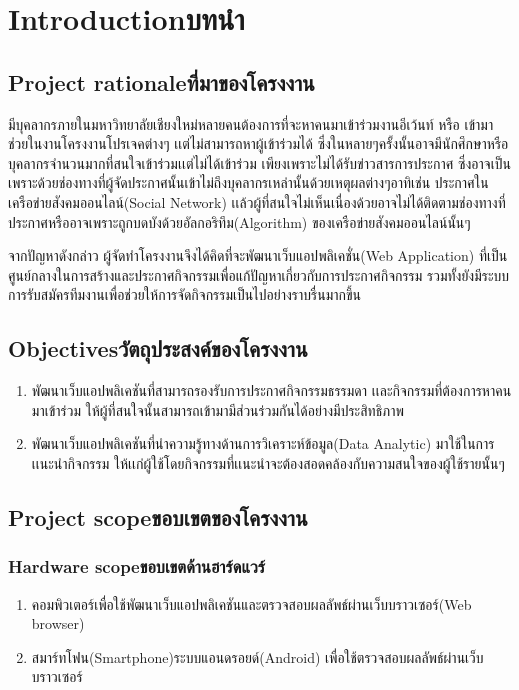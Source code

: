 \chapter{\ifenglish Introduction\else บทนำ\fi}

\section{\ifenglish Project rationale\else ที่มาของโครงงาน\fi}
มีบุคลากรภายในมหาวิทยาลัยเชียงใหม่หลายคนต้องการที่จะหาคนมาเข้าร่วมงานอีเว้นท์ หรือ เข้ามาช่วยในงานโครงงานโปรเจคต่างๆ เเต่ไม่สามารถหาผู้เข้าร่วมได้ ซึ่งในหลายๆครั้งนั้นอาจมีนักศึกษาหรือบุคลากรจำนวนมากที่สนใจเข้าร่วมเเต่ไม่ได้เข้าร่วม เพียงเพราะไม่ได้รับข่าวสารการประกาศ ซึ่งอาจเป็นเพราะด้วยช่องทางที่ผู้จัดประกาศนั้นเข้าไม่ถึงบุคลากรเหล่านั้นด้วยเหตุผลต่างๆอาทิเช่น ประกาศในเครือข่ายสังคมออนไลน์(Social Network) เเล้วผู้ที่สนใจไม่เห็นเนื่องด้วยอาจไม่ได้ติดตามช่องทางที่ประกาศหรืออาจเพราะถูกบดบังด้วยอัลกอริทึม(Algorithm) ของเครือข่ายสังคมออนไลน์นั้นๆ

จากปัญหาดังกล่าว ผู้จัดทำโครงงานจึงได้คิดที่จะพัฒนาเว็บแอปพลิเคชั่น(Web Application) ที่เป็นศูนย์กลางในการสร้างและประกาศกิจกรรมเพื่อแก้ปัญหาเกี่ยวกับการประกาศกิจกรรม รวมทั้งยังมีระบบการรับสมัครทีมงานเพื่อช่วยให้การจัดกิจกรรมเป็นไปอย่างราบรื่นมากขึ้น


\section{\ifenglish Objectives\else วัตถุประสงค์ของโครงงาน\fi}
\begin{enumerate}
    \item พัฒนาเว็บแอปพลิเคชันที่สามารถรองรับการประกาศกิจกรรมธรรมดา เเละกิจกรรมที่ต้องการหาคนมาเข้าร่วม ให้ผู้ที่สนใจนั้นสามารถเข้ามามีส่วนร่วมกันได้อย่างมีประสิทธิภาพ
    \item พัฒนาเว็บแอปพลิเคชันที่นำความรู้ทางด้านการวิเคราะห์ข้อมูล(Data Analytic) มาใช้ในการเเนะนำกิจกรรม ให้เเก่ผู้ใช้โดยกิจกรรมที่เเนะนำจะต้องสอดคล้องกับความสนใจของผู้ใช้รายนั้นๆ
\end{enumerate}

\section{\ifenglish Project scope\else ขอบเขตของโครงงาน\fi}

\subsection{\ifenglish Hardware scope\else ขอบเขตด้านฮาร์ดแวร์\fi}
\begin{enumerate}
    \item คอมพิวเตอร์เพื่อใช้พัฒนาเว็บแอปพลิเคชันและตรวจสอบผลลัพธ์ผ่านเว็บบราวเซอร์(Web browser)
    \item สมาร์ทโฟน(Smartphone)ระบบแอนดรอยด์(Android) เพื่อใช้ตรวจสอบผลลัพธ์ผ่านเว็บบราวเซอร์
\end{enumerate}

